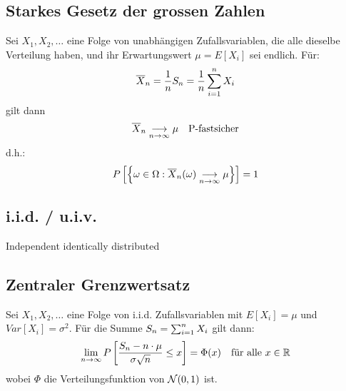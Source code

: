 \subsection*{Starkes Gesetz der grossen Zahlen}
Sei $X_1, X_2, \dots$ eine Folge von unabhängigen Zufallsvariablen, die alle
dieselbe Verteilung haben, und ihr Erwartungswert $\mu = E[X_i]$ sei endlich.
Für:
\begin{align*}
  \overline{X}_n = \frac{1}{n} S_n = \frac{1}{n} \sum_{i = 1}^n X_i
\end{align*}
gilt dann
\begin{align*}
  \overline{X}_n \underset{n \rightarrow \infty}{\longrightarrow} \mu &  & \text{P-fastsicher}
\end{align*}
d.h.:
\begin{align*}
  P \left[ \left\{ \omega \in \Omega : \overline{X}_n (\omega) \underset{n \rightarrow \infty}{\longrightarrow} \mu \right\} \right] = 1
\end{align*}
\subsection*{i.i.d. / u.i.v.}
Independent identically distributed
\subsection*{Zentraler Grenzwertsatz}
Sei $X_1, X_2, \dots$ eine Folge von i.i.d. Zufallsvariablen mit $E[X_i] = \mu$
und $Var[X_i] = \sigma^2$. Für die Summe $S_n = \sum_{i = 1}^n X_i$ gilt dann:
\begin{align*}
  \lim_{n \rightarrow \infty} P \left[ \frac{S_n - n \cdot \mu}{\sigma \sqrt{n}} \leq x \right] = \Phi (x)
   &  & \text{für alle } x \in \mathbb{R}
\end{align*}
wobei $\Phi$ die Verteilungsfunktion von $\mathcal{N} (0, 1)$ ist.